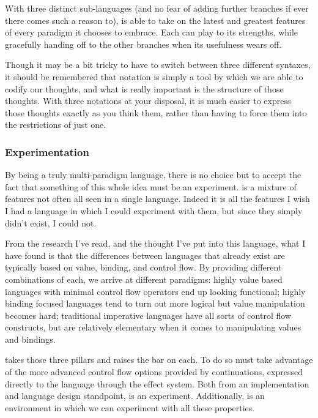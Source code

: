 With three distinct sub-languages (and no fear of adding further branches if
ever there comes such a reason to), \Trilogy{} is able to take on the latest
and greatest features of every paradigm it chooses to embrace. Each can play
to its strengths, while gracefully handing off to the other branches when
its usefulness wears off.

Though it may be a bit tricky to have to switch between three different
syntaxes, it should be remembered that notation is simply a tool by which
we are able to codify our thoughts, and what is really important is the
structure of those thoughts. With three notations at your disposal, it is
much easier to express those thoughts exactly as you think them, rather than
having to force them into the restrictions of just one.

\subsubsection{Experimentation}

By being a truly multi-paradigm language, there is no choice but to accept the
fact that something of this whole idea must be an experiment. \Trilogy{} is a
mixture of features not often all seen in a single language. Indeed it is all
the features I wish I had a language in which I could experiment with them,
but since they simply didn't exist, I could not.

From the research I've read, and the thought I've put into this language, what
I have found is that the differences between languages that already exist are
typically based on value, binding, and control flow. By providing different
combinations of each, we arrive at different paradigms: highly value based
languages with minimal control flow operators end up looking functional; highly
binding focused languages tend to turn out more logical but value manipulation
becomes hard; traditional imperative languages have all sorts of control flow
constructs, but are relatively elementary when it comes to manipulating values
and bindings.

\Trilogy{} takes those three pillars and raises the bar on each. To do so must
take advantage of the more advanced control flow options provided by continuations,
expressed directly to the language through the effect system. Both from an
implementation and language design standpoint, \Trilogy{} is an experiment.
Additionally, \Trilogy{} is an environment in which we can experiment with
all these properties.

